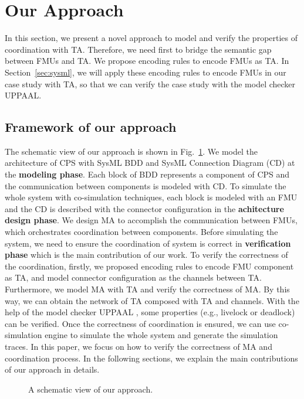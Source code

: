 \section{Our Approach}
In this section, we present a novel approach to model and verify the properties of coordination with TA. Therefore, we need first to bridge the semantic gap between FMUs and TA. We propose encoding rules to encode FMUs as TA. In Section~\ref{sec:sysml}, we will apply these encoding rules to encode FMUs in our case study with TA, so that we can verify the case study with the model checker UPPAAL.
\label{sec:encoding}
\subsection{Framework of our approach}
The schematic view of our approach is shown in Fig.~\ref{paper-arc}. We model the architecture of CPS with SysML BDD and SysML Connection Diagram (CD) at the \textbf{modeling phase}. Each block of BDD represents a component of CPS and the communication between components is modeled with CD. To simulate the whole system with co-simulation techniques, each block is modeled with an FMU and the CD is described with the connector configuration in the \textbf{achitecture design phase}. We design MA to accomplish the communication between FMUs, which orchestrates coordination between components. Before simulating the system, we need to ensure the coordination of system is correct in \textbf{verification phase} which is the main contribution of our work. To verify the correctness of the coordination, firstly, we proposed encoding rules to encode FMU component as TA, and model connector configuration as the channels between TA. Furthermore, we model MA with TA and verify the correctness of MA. By this way, we can obtain the network of TA composed with TA and channels. With the help of the model checker UPPAAL \cite{BehrmannDLHPYH06}, some properties (e.g., livelock or deadlock) can be verified. Once the correctness of coordination is ensured, we can use co-simulation engine to simulate the whole system and generate the simulation traces. In this paper, we focus on how to verify the correctness of MA and coordination process. In the following sections, we explain the main contributions of our approach in details.
\begin{figure}[htbp]
	\caption{A schematic view of our approach.}
	\label{paper-arc}
\end{figure}

